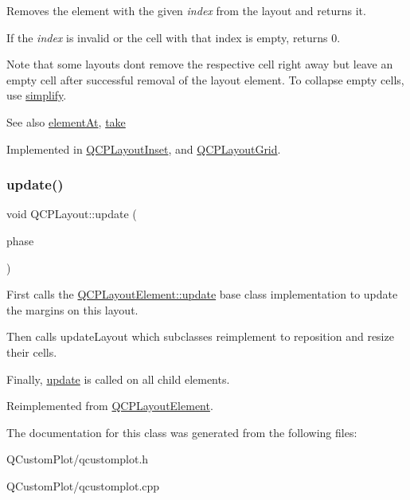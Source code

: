 Removes the element with the given {\itshape index} from the layout and returns it.

If the {\itshape index} is invalid or the cell with that index is empty, returns 0.

Note that some layouts don\textquotesingle{}t remove the respective cell right away but leave an empty cell after successful removal of the layout element. To collapse empty cells, use \mbox{\hyperlink{class_q_c_p_layout_a41e6ac049143866e8f8b4964efab01b2}{simplify}}.

\begin{DoxySeeAlso}{See also}
\mbox{\hyperlink{class_q_c_p_layout_afa73ca7d859f8a3ee5c73c9b353d2a56}{element\+At}}, \mbox{\hyperlink{class_q_c_p_layout_ada26cd17e56472b0b4d7fbbc96873e4c}{take}} 
\end{DoxySeeAlso}


Implemented in \mbox{\hyperlink{class_q_c_p_layout_inset_abf2e8233f5b7051220907e62ded490a2}{Q\+C\+P\+Layout\+Inset}}, and \mbox{\hyperlink{class_q_c_p_layout_grid_a17dd220234d1bbf8835abcc666384d45}{Q\+C\+P\+Layout\+Grid}}.

\mbox{\label{class_q_c_p_layout_a48ecc9c98ea90b547c3e27a931a8f7bd}} 
\subsubsection{\texorpdfstring{update()}{update()}}
{\footnotesize\ttfamily void Q\+C\+P\+Layout\+::update (\begin{DoxyParamCaption}\item[{\mbox{\hyperlink{class_q_c_p_layout_element_a0d83360e05735735aaf6d7983c56374d}{Update\+Phase}}}]{phase }\end{DoxyParamCaption})\hspace{0.3cm}{\ttfamily [virtual]}}

First calls the \mbox{\hyperlink{class_q_c_p_layout_element_a929c2ec62e0e0e1d8418eaa802e2af9b}{Q\+C\+P\+Layout\+Element\+::update}} base class implementation to update the margins on this layout.

Then calls update\+Layout which subclasses reimplement to reposition and resize their cells.

Finally, \mbox{\hyperlink{class_q_c_p_layout_a48ecc9c98ea90b547c3e27a931a8f7bd}{update}} is called on all child elements. 

Reimplemented from \mbox{\hyperlink{class_q_c_p_layout_element_a929c2ec62e0e0e1d8418eaa802e2af9b}{Q\+C\+P\+Layout\+Element}}.



The documentation for this class was generated from the following files\+:\begin{DoxyCompactItemize}
\item 
Q\+Custom\+Plot/qcustomplot.\+h\item 
Q\+Custom\+Plot/qcustomplot.\+cpp\end{DoxyCompactItemize}
